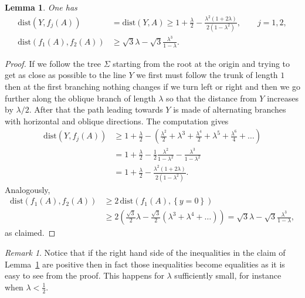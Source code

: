 \documentclass{amsart}
\newcommand{\enclose}[1]{\left(#1\right)}
\newcommand{\ENCLOSE}[1]{\left\{#1\right\}}
\newcommand{\dist}{\mathrm{dist}}
\newtheorem{lemma}[theorem]{Lemma}
\theoremstyle{definition}
\theoremstyle{remark}
\newtheorem{remark}[theorem]{Remark}
\begin{document}
\begin{lemma}\label{lm:precedente1}
One has
\begin{align*}
    \dist(Y,f_j(A)) 
    &=\dist(Y,A)
    \ge
    1+ \frac{\lambda} 2 
    - \frac{\lambda^2(1+2\lambda)}{2(1-\lambda^2)},
    \qquad j=1,2,
    \\
    \dist(f_1(A),f_2(A)) & 
    \ge 
    \sqrt 3 \lambda - \sqrt 3 \frac{\lambda^3}{1-\lambda}.
\end{align*}
\end{lemma}
\begin{proof}
If we follow the tree $\Sigma$ starting from the root 
at the origin and trying to get as close as possible 
to the line $Y$ we first must follow the trunk of length 
$1$ then at the first branching nothing changes if we
turn left or right and then we go further along 
the oblique branch of length $\lambda$ so that the distance 
from $Y$ increases by $\lambda /2$. 
After that the path leading towards $Y$ is made 
of alternating branches with horizontal and oblique directions.
The computation gives
  \begin{align*}
  \dist(Y,f_j(A)) &\ge 1+ \frac \lambda 2 
     - \enclose{\frac{\lambda^2}{2} 
      + \lambda^3 
      + \frac{\lambda^4 }{2}
      + \lambda^5
      + \frac{\lambda^6}{4} + \dots}\\
      &= 1 + \frac \lambda 2 
      - \frac{1}{2}\frac{\lambda^2}{1-\lambda^2}
      - \frac{\lambda^3}{1-\lambda^2}\\
      &= 1+ \frac{\lambda} 2 
      - \frac{\lambda^2(1+2\lambda)}{2(1-\lambda^2)}.
  \end{align*}
  Analogously,  
  \begin{align*}
    \dist(f_1(A),f_2(A))
    &\ge 2\, \dist(f_1(A),\ENCLOSE{y=0}) \\
    &\ge 2\enclose{\frac{\sqrt 3}{2} \lambda 
      -\frac{\sqrt 3}{2}\enclose{\lambda^3 + \lambda^4 + \dots}
     }
    = \sqrt 3 \lambda -\sqrt 3 \frac{\lambda^3}{1-\lambda},
  \end{align*}
  as claimed.
\end{proof}

\begin{remark}
  Notice that if the right hand side of the inequalities 
  in the claim of Lemma~\ref{lm:precedente1}
  are positive then in fact those inequalities 
  become equalities as it is easy to see from the proof.
  This happens for $\lambda$ sufficiently small, 
  for instance when $\lambda < \frac 1 2$.
\end{remark}
\end{document}
